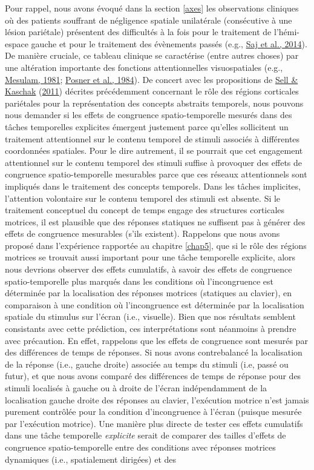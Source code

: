 \documentclass[
  a4paper,12pt,twoside,onecolumn,openright,final,oldfontcommands]{memoir}
\begin{document}
Pour rappel, nous avons évoqué dans la section \ref{axes} les observations cliniques où des patients souffrant de négligence spatiale unilatérale (consécutive à une lésion pariétale) présentent des difficultés à la fois pour le traitement de l'hémi-espace gauche et pour le traitement des évènements passés (e.g., \protect\hyperlink{ref-saj_patients_2014}{Saj et al., 2014}). De manière cruciale, ce tableau clinique se caractérise (entre autres choses) par une altération importante des fonctions attentionnelles visuospatiales (e.g., \protect\hyperlink{ref-mesulam_cortical_1981}{Mesulam, 1981}; \protect\hyperlink{ref-posner_effects_1984}{Posner et al., 1984}). De concert avec les propositions de \protect\hyperlink{ref-sell_processing_2011}{Sell \& Kaschak} (\protect\hyperlink{ref-sell_processing_2011}{2011}) décrites précédemment concernant le rôle des régions corticales pariétales pour la représentation des concepts abstraits temporels, nous pouvons nous demander si les effets de congruence spatio-temporelle mesurés dans des tâches temporelles explicites émergent justement parce qu'elles sollicitent un traitement attentionnel sur le contenu temporel de stimuli associés à différentes coordonnées spatiales. Pour le dire autrement, il se pourrait que cet engagement attentionnel sur le contenu temporel des stimuli suffise à provoquer des effets de congruence spatio-temporelle mesurables parce que ces réseaux attentionnels sont impliqués dans le traitement des concepts temporels. Dans les tâches implicites, l'attention volontaire sur le contenu temporel des stimuli est absente. Si le traitement conceptuel du concept de temps engage des structures corticales motrices, il est plausible que des réponses statiques ne suffisent pas à générer des effets de congruence mesurables (s'ils existent). Rappelons que nous avons proposé dans l'expérience rapportée au chapitre \ref{chap5}, que si le rôle des régions motrices se trouvait aussi important pour une tâche temporelle explicite, alors nous devrions observer des effets cumulatifs, à savoir des effets de congruence spatio-temporelle plus marqués dans les conditions où l'incongruence est déterminée par la localisation des réponses motrices (statiques au clavier), en comparaison à une condition où l'incongruence est déterminée par la localisation spatiale du stimulus sur l'écran (i.e., visuelle). Bien que nos résultats semblent consistants avec cette prédiction, ces interprétations sont néanmoins à prendre avec précaution. En effet, rappelons que les effets de congruence sont mesurés par des différences de temps de réponses. Si nous avons contrebalancé la localisation de la réponse (i.e., gauche droite) associée au temps du stimuli (i.e, passé ou futur), et que nous avons comparé des différences de temps de réponse pour des stimuli localisés à gauche ou à droite de l'écran indépendamment de la localisation gauche droite des réponses au clavier, l'exécution motrice n'est jamais purement contrôlée pour la condition d'incongruence à l'écran (puisque mesurée par l'exécution motrice). Une manière plus directe de tester ces effets cumulatifs dans une tâche temporelle \emph{explicite} serait de comparer des tailles d'effets de congruence spatio-temporelle entre des conditions avec réponses motrices dynamiques (i.e., spatialement dirigées) et des 
\end{document}
